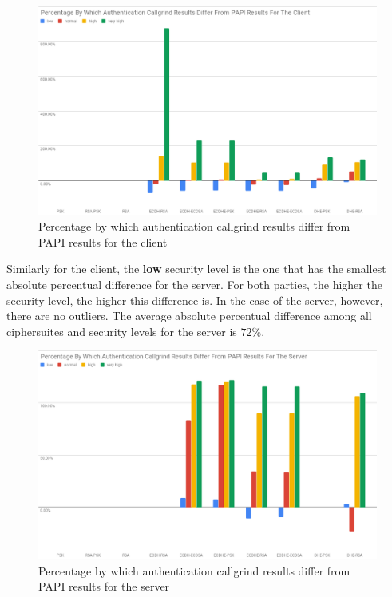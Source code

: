 \documentclass{llncs}
\begin{document}
\begin{figure}
  \centering
  \includegraphics[width=1.0\textwidth]{img/papi-vs-auth-costs-client.png}
  \centering \caption{\label{fig:papi-vs-auth-costs-client} Percentage by which authentication callgrind results differ from PAPI results for the client}
\end{figure}

Similarly for the client, the \textbf{low} security level is the one that has the smallest absolute percentual difference for the server.
For both parties, the higher the security level, the higher this difference is. In the case of the server, however, there are no outliers.
The average absolute percentual difference among all ciphersuites and security levels for the server is $72\%$.

\begin{figure}
  \centering
  \includegraphics[width=1.0\textwidth]{img/papi-vs-auth-costs-server.png}
  \centering \caption{\label{fig:papi-vs-auth-costs-server} Percentage by which authentication callgrind results differ from PAPI results for the server} 
 \end{figure}
\end{document}
